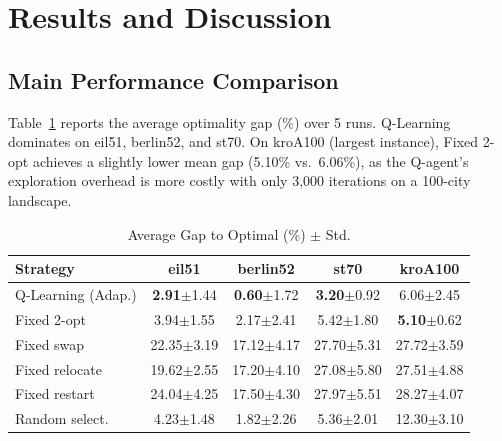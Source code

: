 \documentclass[10pt,twocolumn]{article}
\begin{document}
\section{Results and Discussion}

\subsection{Main Performance Comparison}

Table~\ref{tab:main} reports the average optimality gap (\%) over 5 runs.
Q-Learning dominates on eil51, berlin52, and st70. On kroA100 (largest instance),
Fixed 2-opt achieves a slightly lower mean gap (5.10\% vs.\ 6.06\%), as the
Q-agent's exploration overhead is more costly with only 3,000 iterations on a
100-city landscape.
\begin{table}[H]
\centering
\caption{Average Gap to Optimal (\%) $\pm$ Std.}
\label{tab:main}

\footnotesize %
\setlength{\tabcolsep}{3pt} %

\begin{tabular}{lcccc}
\toprule
\textbf{Strategy} & \textbf{eil51} & \textbf{berlin52} & \textbf{st70} & \textbf{kroA100} \\
\midrule
Q-Learning (Adap.)    & \textbf{2.91}$\pm$1.44 & \textbf{0.60}$\pm$1.72 & \textbf{3.20}$\pm$0.92 & 6.06$\pm$2.45 \\
Fixed 2-opt           & 3.94$\pm$1.55 & 2.17$\pm$2.41 & 5.42$\pm$1.80 & \textbf{5.10}$\pm$0.62 \\
Fixed swap            & 22.35$\pm$3.19 & 17.12$\pm$4.17 & 27.70$\pm$5.31 & 27.72$\pm$3.59 \\
Fixed relocate        & 19.62$\pm$2.55 & 17.20$\pm$4.10 & 27.08$\pm$5.80 & 27.51$\pm$4.88 \\
Fixed restart         & 24.04$\pm$4.25 & 17.50$\pm$4.30 & 27.97$\pm$5.51 & 28.27$\pm$4.07 \\
Random select.        & 4.23$\pm$1.48 & 1.82$\pm$2.26 & 5.36$\pm$2.01 & 12.30$\pm$3.10 \\
\bottomrule
\end{tabular}
\end{table}
\end{document}
